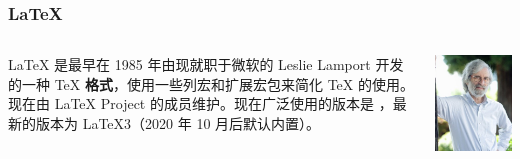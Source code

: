 \begin{shadedsection}
\begin{frame}
  \frametitle{\LaTeX{}}
  \begin{columns}[c]
    \begin{column}{0.7\textwidth}
      \begin{center}
        \rmfamily\Huge
        \highlight[structure]{\LaTeX{}}
      \end{center}
      \begin{center}
        \parbox{0.75\textwidth}{
          \LaTeX{} 是最早在 1985 年由现就职于微软的 Leslie Lamport 开发的一种 \TeX{} \textbf{格式}\footnotemark，使用一些列宏和扩展宏包来简化 \TeX{} 的使用。现在由 \LaTeX{} Project 的成员维护。现在广泛使用的版本是 \LaTeXe{}，最新的版本为 \LaTeX3（2020 年 10 月后默认内置）。
        }
      \end{center}
    \end{column}
    \begin{column}{0.3\textwidth}
      \includegraphics[width=.8\columnwidth]{support/images/Lamport.jpg}
    \end{column}
  \end{columns}
\end{frame}


\end{shadedsection}
